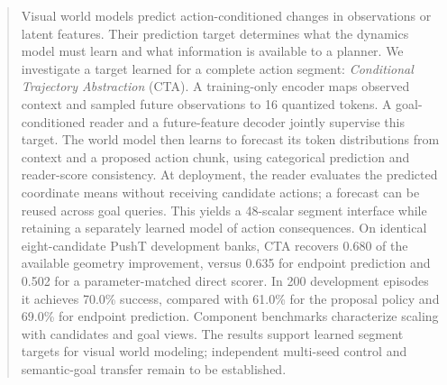 \begin{abstract}
Visual world models predict action-conditioned changes in observations or latent features. Their prediction target determines what the dynamics model must learn and what information is available to a planner. We investigate a target learned for a complete action segment: \emph{Conditional Trajectory Abstraction} (CTA). A training-only encoder maps observed context and sampled future observations to 16 quantized tokens. A goal-conditioned reader and a future-feature decoder jointly supervise this target. The world model then learns to forecast its token distributions from context and a proposed action chunk, using categorical prediction and reader-score consistency. At deployment, the reader evaluates the predicted coordinate means without receiving candidate actions; a forecast can be reused across goal queries. This yields a 48-scalar segment interface while retaining a separately learned model of action consequences. On identical eight-candidate PushT development banks, CTA recovers 0.680 of the available geometry improvement, versus 0.635 for endpoint prediction and 0.502 for a parameter-matched direct scorer. In 200 development episodes it achieves 70.0\% success, compared with 61.0\% for the proposal policy and 69.0\% for endpoint prediction. Component benchmarks characterize scaling with candidates and goal views. The results support learned segment targets for visual world modeling; independent multi-seed control and semantic-goal transfer remain to be established.
\end{abstract}
